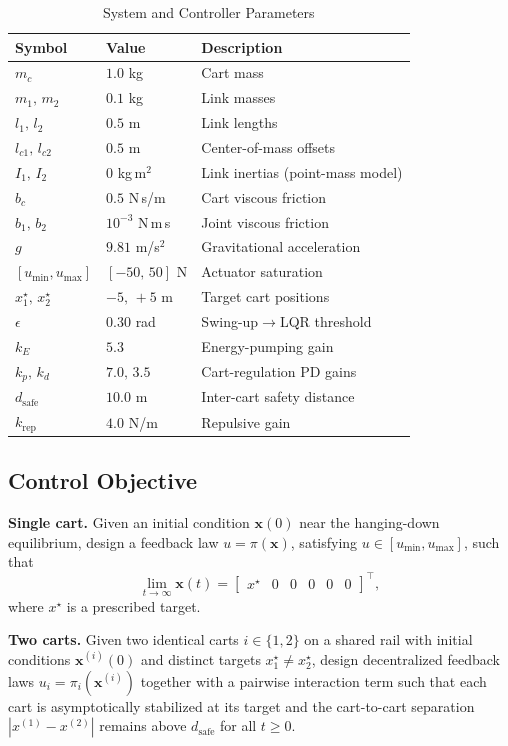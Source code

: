 \documentclass[conference]{IEEEtran}
\begin{document}
\begin{table}[t]
\caption{System and Controller Parameters}
\label{tab:params}
\centering
\begin{tabular}{@{}lll@{}}
\toprule
Symbol & Value & Description \\
\midrule
$m_c$ & $1.0$ kg & Cart mass \\
$m_1,\,m_2$ & $0.1$ kg & Link masses \\
$l_1,\,l_2$ & $0.5$ m & Link lengths \\
$l_{c1},\,l_{c2}$ & $0.5$ m & Center-of-mass offsets \\
$I_1,\,I_2$ & $0$ kg\,m$^2$ & Link inertias (point-mass model) \\
$b_c$ & $0.5$ N\,s/m & Cart viscous friction \\
$b_1,\,b_2$ & $10^{-3}$ N\,m\,s & Joint viscous friction \\
$g$ & $9.81$ m/s$^2$ & Gravitational acceleration \\
$[u_{\min},u_{\max}]$ & $[-50,\,50]$ N & Actuator saturation \\
$x^\star_1,\,x^\star_2$ & $-5,\,+5$ m & Target cart positions \\
$\epsilon$ & $0.30$ rad & Swing-up$\to$LQR threshold \\
$k_E$ & $5.3$ & Energy-pumping gain \\
$k_p,\,k_d$ & $7.0,\,3.5$ & Cart-regulation PD gains \\
$d_{\text{safe}}$ & $10.0$ m & Inter-cart safety distance \\
$k_{\text{rep}}$ & $4.0$ N/m & Repulsive gain \\
\bottomrule
\end{tabular}
\end{table}

\subsection{Control Objective}
\textbf{Single cart.} Given an initial condition $\mathbf{x}(0)$ near the hanging-down equilibrium, design a feedback law $u=\pi(\mathbf{x})$, satisfying $u\in[u_{\min},u_{\max}]$, such that
\begin{equation}
\lim_{t\to\infty}\mathbf{x}(t) = \begin{bmatrix}x^\star & 0 & 0 & 0 & 0 & 0\end{bmatrix}^{\!\top},
\end{equation}
where $x^\star$ is a prescribed target.

\textbf{Two carts.} Given two identical carts $i\in\{1,2\}$ on a shared rail with initial conditions $\mathbf{x}^{(i)}(0)$ and distinct targets $x^\star_1\ne x^\star_2$, design decentralized feedback laws $u_i=\pi_i(\mathbf{x}^{(i)})$ together with a pairwise interaction term such that each cart is asymptotically stabilized at its target and the cart-to-cart separation $|x^{(1)}-x^{(2)}|$ remains above $d_{\text{safe}}$ for all $t\ge0$.
\end{document}

